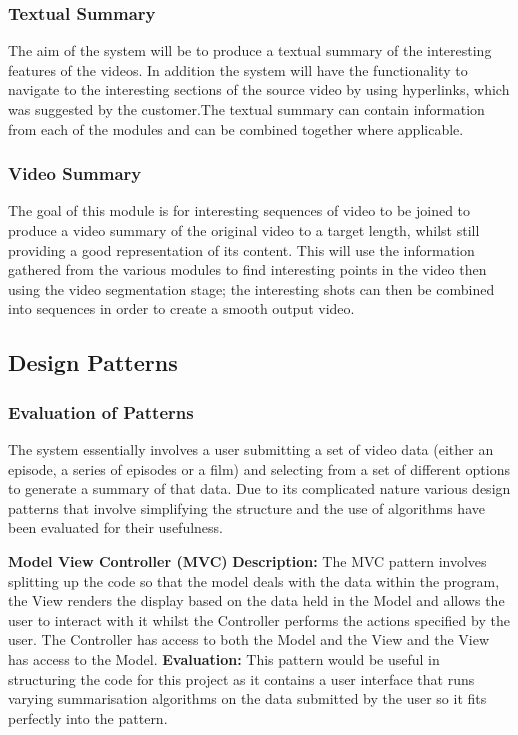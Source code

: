 \subsubsection{Textual Summary}
The aim of the system will be to produce a textual summary of the interesting features of the videos. In addition the system will have the 
functionality to navigate to the interesting sections of the source video by using hyperlinks, which was suggested by the customer.The 
textual summary can contain information from each of the modules and can be combined together where applicable.

\subsubsection{Video Summary}
The goal of this module is for interesting sequences of video to be joined to produce a video summary of the original video to a target 
length, whilst still providing a good representation of its content. This will use the information gathered from the various modules to find interesting 
points in the video then using the video segmentation stage; the interesting shots can then be combined into sequences in order to create a smooth 
output video.

\newpage
\subsection{Design Patterns}

\subsubsection{Evaluation of Patterns}
The system essentially involves a user submitting a set of video data (either an episode, a series of episodes or a film) and selecting from 
a set of different options to generate a summary of that data. Due to its complicated nature various design patterns that involve 
simplifying the structure and the use of algorithms have been evaluated for their usefulness. 

\textbf{Model View Controller (MVC)}
\newline
\textbf{Description:} The MVC pattern involves splitting up the code so that the model deals with the data within the program, the View renders the 
display based on the data held in the Model and allows the user to interact with it whilst the Controller performs the actions specified by 
the user. The Controller has access to both the Model and the View and the View has access to the Model.
\newline
\textbf{Evaluation:} This pattern would be useful in structuring the code for this project as it contains a user interface that runs varying summarisation algorithms on the data submitted by the user so it fits perfectly into the pattern.

